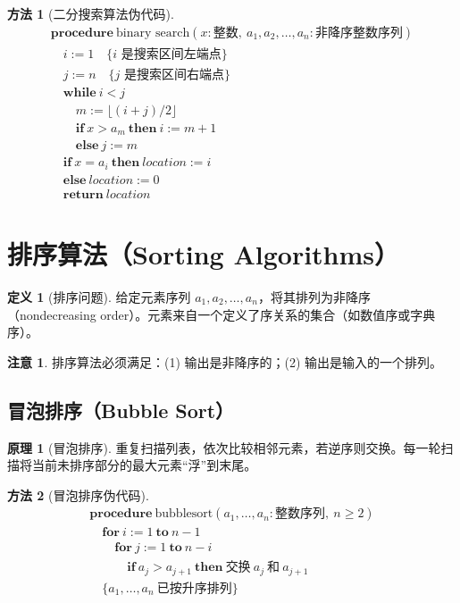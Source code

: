 \documentclass[UTF8,11pt,a4paper]{ctexbook}   %
\theoremstyle{definition}
\newtheorem{definition}{定义}[section]
\newtheorem{principle}{原理}[section]
\newtheorem{warning}{注意}[section]
\newtheorem{method}{方法}[section]
\begin{document}
\begin{method}[二分搜索算法伪代码]
\[
\begin{array}{l}
\textbf{procedure}\ \text{binary search}(x: \text{整数},\ a_1, a_2, \ldots, a_n: \text{非降序整数序列})\\
\quad i := 1 \quad \{i \text{ 是搜索区间左端点}\}\\
\quad j := n \quad \{j \text{ 是搜索区间右端点}\}\\
\quad \textbf{while}\ i < j\\
\quad \quad m := \lfloor (i + j) / 2\rfloor\\
\quad \quad \textbf{if}\ x > a_m\ \textbf{then}\ i := m + 1\\
\quad \quad \textbf{else}\ j := m\\
\quad \textbf{if}\ x = a_i\ \textbf{then}\ location := i\\
\quad \textbf{else}\ location := 0\\
\quad \textbf{return}\ location
\end{array}
\]
\end{method}

\section{排序算法（Sorting Algorithms）}

\begin{definition}[排序问题]
给定元素序列 $a_1, a_2, \ldots, a_n$，将其排列为非降序（nondecreasing order）。元素来自一个定义了序关系的集合（如数值序或字典序）。
\end{definition}

\begin{warning}
排序算法必须满足：(1) 输出是非降序的；(2) 输出是输入的一个排列。
\end{warning}

\subsection{冒泡排序（Bubble Sort）}

\begin{principle}[冒泡排序]
重复扫描列表，依次比较相邻元素，若逆序则交换。每一轮扫描将当前未排序部分的最大元素“浮”到末尾。
\end{principle}

\begin{method}[冒泡排序伪代码]
\[
\begin{array}{l}
\textbf{procedure}\ \text{bubblesort}(a_1, \ldots, a_n: \text{整数序列},\ n \geq 2)\\
\quad \textbf{for}\ i := 1\ \textbf{to}\ n - 1\\
\quad \quad \textbf{for}\ j := 1\ \textbf{to}\ n - i\\
\quad \quad \quad \textbf{if}\ a_j > a_{j+1}\ \textbf{then}\ \text{交换}\ a_j\ \text{和}\ a_{j+1}\\
\quad \{a_1, \ldots, a_n\ \text{已按升序排列}\}
\end{array}
\]
\end{method}
\end{document}

